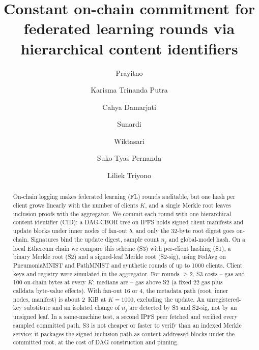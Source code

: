 \documentclass[final,3p,times,twocolumn]{elsarticle}
\begin{document}
\begin{frontmatter}

\title{Constant on-chain commitment for federated learning rounds via hierarchical content identifiers}

\author[a,b,c]{Prayitno}
\author[b]{Karisma Trinanda Putra}
\author[d]{Cahya Damarjati}
\author[e]{Sunardi}
\author[a]{Wiktasari}
\author[a]{Suko Tyas Pernanda}
\author[a]{Liliek Triyono}

\address[a]{Department of Electrical Engineering, Politeknik Negeri Semarang, Jl. Prof. H. Soedarto, S.H., Tembalang, Semarang 50275, Indonesia}
\address[b]{Department of Electrical Engineering, Universitas Muhammadiyah Yogyakarta, Jl. Brawijaya, Tamantirto, Kasihan, Bantul, Yogyakarta 55183, Indonesia}
\address[c]{Department of Research and Development, SEAMEO SEAMOLEC, Kompleks Universitas Terbuka, Jl. Cabe Raya, Pondok Cabe, Pamulang, South Tangerang 15418, Indonesia}
\address[d]{Department of Information Technology, Universitas Muhammadiyah Yogyakarta, Jl. Brawijaya, Tamantirto, Kasihan, Bantul, Yogyakarta 55183, Indonesia}
\address[e]{Department of Mechanical Engineering, Universitas Muhammadiyah Yogyakarta, Jl. Brawijaya, Tamantirto, Kasihan, Bantul, Yogyakarta 55183, Indonesia}


\begin{abstract}
On-chain logging makes federated learning (FL) rounds auditable, but one hash per client grows linearly with the number of clients $K$, and a single Merkle root leaves inclusion proofs with the aggregator. We commit each round with one hierarchical content identifier (CID): a DAG-CBOR tree on IPFS holds signed client manifests and update blocks under inner nodes of fan-out $b$, and only the 32-byte root digest goes on-chain. Signatures bind the update digest, sample count $n_j$ and global-model hash. On a local Ethereum chain we compare this scheme (S3) with per-client hashing (S1), a binary Merkle root (S2) and a signed-leaf Merkle root (S2-sig), using FedAvg on PneumoniaMNIST and PathMNIST and synthetic rounds of up to 1000 clients. Client keys and registry were simulated in the aggregator. For rounds $\geq 2$, S3 costs -- gas and 100 on-chain bytes at every $K$; medians are -- gas above S2 (a fixed 22 gas plus calldata byte-value effects). With fan-out 16 or 4, the metadata path (root, inner nodes, manifest) is about 2~KiB at $K=1000$, excluding the update. An unregistered-key substitute and an isolated change of $n_j$ are detected by S3 and S2-sig, not by an unsigned leaf. In a same-machine test, a second IPFS peer fetched and verified every sampled committed path. S3 is not cheaper or faster to verify than an indexed Merkle service; it packages the signed inclusion path as content-addressed blocks under the committed root, at the cost of DAG construction and pinning.
\end{abstract}


\end{frontmatter}
\end{document}
